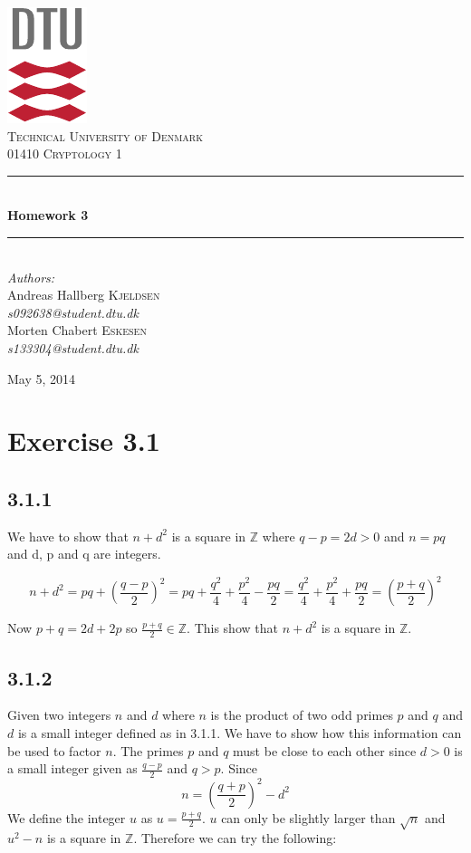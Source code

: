 \documentclass[11pt]{report}
\newcommand{\HRule}{\rule{\linewidth}{0.5mm}}
\begin{document}
\begin{titlepage}
\begin{center}

\includegraphics[scale=2.0]{../GFX/dtu_logo.pdf}\\[1cm]
\textsc{\LARGE Technical University of Denmark}\\[1.5cm]
\textsc{\Large 01410 Cryptology 1}\\[0.5cm]

\HRule \\[0.4cm]
{\huge \bfseries Homework 3}\\[0.1cm]
\HRule \\[1.5cm]

{\large
\emph{Authors:} \\[10pt]
Andreas Hallberg \textsc{Kjeldsen}\\
\emph{s092638@student.dtu.dk} \\[10pt]
Morten Chabert \textsc{Eskesen}\\
\emph{s133304@student.dtu.dk}
}
\vfill

{\large May 5, 2014}

\end{center}
\end{titlepage}

\section*{Exercise 3.1}
\subsection*{3.1.1}
We have to show that $n + d^2$ is a square in $\mathbb{Z}$ where $q - p = 2d > 0$ and $n = pq$ and d, p and q are integers.

$$n + d^2 = pq + (\frac{q-p}{2})^2 = pq + \frac{q^2}{4} + \frac{p^2}{4} - \frac{pq}{2} = \frac{q^2}{4} + \frac{p^2}{4}+\frac{pq}{2} = (\frac{p+q}{2})^2$$

Now $p + q = 2d + 2p$ so $\frac{p+q}{2} \in \mathbb{Z}$. This show that $n + d^2$ is a square in $\mathbb{Z}$.

\subsection*{3.1.2}
Given two integers $n$ and $d$ where $n$ is the product of two odd primes $p$ and $q$ and $d$ is a small integer defined as in 3.1.1. We have to show how this information can be used to factor $n$. The primes $p$ and $q$ must be close to each other since $d > 0$ is a small integer given as $\frac{q-p}{2}$ and $q > p$. Since
$$n = (\frac{q + p}{2})^2 - d^2$$
We define the integer $u$ as $u = \frac{p+q}{2}$. $u$ can only be slightly larger than $\sqrt{n}$ and $u^2 - n$ is a square in $\mathbb{Z}$. Therefore we can try the following:
\end{document}
